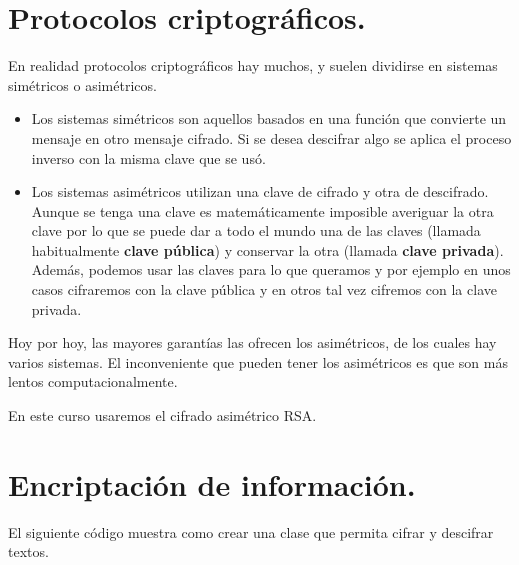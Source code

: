 \documentclass[a4paper,12pt,spanish]{sphinxmanual}
\begin{document}
\section{Protocolos criptográficos.}
\label{textos/tema5:protocolos-criptograficos}
En realidad protocolos criptográficos hay muchos, y suelen dividirse en sistemas simétricos o asimétricos.
\begin{itemize}
\item {} 
Los sistemas simétricos son aquellos basados en una función que convierte un mensaje en otro mensaje cifrado. Si se desea descifrar algo se aplica el proceso inverso con la misma clave que se usó.

\item {} 
Los sistemas asimétricos utilizan una clave de cifrado y otra de descifrado. Aunque se tenga una clave es matemáticamente imposible averiguar la otra clave por lo que se puede dar a todo el mundo una de las claves (llamada habitualmente \textbf{clave pública}) y conservar la otra (llamada \textbf{clave privada}). Además, podemos usar las claves para lo que queramos y por ejemplo en unos casos cifraremos con la clave pública y en otros tal vez cifremos con la clave privada.

\end{itemize}

Hoy por hoy, las mayores garantías las ofrecen los asimétricos, de los cuales hay varios sistemas. El inconveniente que pueden tener los asimétricos es que son más lentos computacionalmente.

En este curso usaremos el cifrado asimétrico RSA.


\section{Encriptación de información.}
\label{textos/tema5:encriptacion-de-informacion}
El siguiente código muestra como crear una clase que permita cifrar y descifrar textos.
\end{document}
